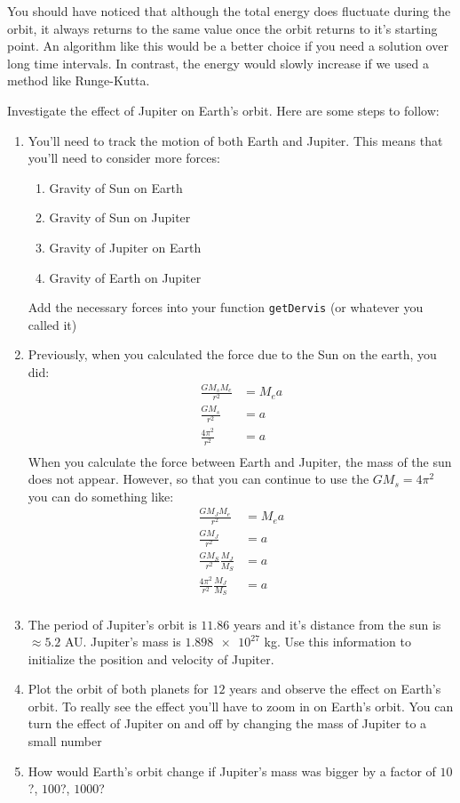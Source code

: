You should have noticed that although the total energy does
fluctuate during the orbit, it always returns to the same value once
the orbit returns to it's starting point.  An algorithm like this
would be a better choice if you need a solution over long time
intervals.  In contrast, the energy would slowly increase if we used a
method like Runge-Kutta.


\begin{enumerate}
\prob Investigate the effect of Jupiter on Earth's orbit.  Here are
some steps to follow:
\begin{enumerate}
\item You'll need to track the motion of both Earth and Jupiter.  This
  means that you'll need to consider more forces:
\begin{enumerate}
\item Gravity of Sun on Earth
\item Gravity of Sun on Jupiter
\item Gravity of Jupiter on Earth
\item Gravity of Earth on Jupiter
\end{enumerate}
Add the necessary forces into your function \texttt{getDervis} (or
whatever you called it)
\item Previously, when you calculated the force due to the Sun on the
  earth, you did:
\begin{align}
\frac{G M_s M_e}{r^2} &= M_e a\\ 
\frac{G M_s}{r^2} &= a\\ 
\frac{4 \pi^2}{r^2} &= a\\ 
\end{align}
When you calculate the force between Earth and Jupiter, the mass of
the sun does not appear.  However, so that you can continue to use the $G M_s = 4 \pi^2$ you can do
something like:
\begin{align}
\frac{G M_J M_e}{r^2} &= M_e a\\ 
\frac{G M_J}{r^2} &= a\\ 
\frac{G M_S}{r^2}\frac{M_J}{M_S} &= a\\ 
\frac{4 \pi^2}{r^2}\frac{M_J}{M_S} &= a\\ 
\end{align}

\item The period of Jupiter's orbit is $11.86$ years and it's distance
  from the sun is $\approx 5.2$ AU.  Jupiter's mass is
  $\num{1.898e27}$ kg. Use this information to initialize the position
  and velocity of Jupiter.
\item Plot the orbit of both planets for $12$ years and observe the
  effect on Earth's orbit.  To really see the effect you'll have to zoom
  in on Earth's orbit.  You can turn the effect of Jupiter on and off
  by changing the mass of Jupiter to a small number
\item How would Earth's orbit change if Jupiter's mass was bigger by a
  factor of $10$?, $100$?, $1000$?
\end{enumerate}

\end{enumerate}
